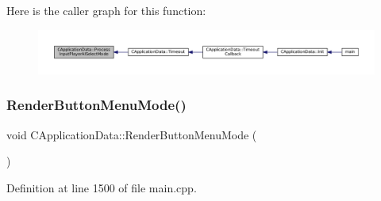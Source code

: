 Here is the caller graph for this function\+:
\nopagebreak
\begin{figure}[H]
\begin{center}
\leavevmode
\includegraphics[width=350pt]{classCApplicationData_a096afda0b6459cfa73d66518ce23f68e_icgraph}
\end{center}
\end{figure}
\hypertarget{classCApplicationData_a4766e5533d32e4194816f5a4ea838bd3}{}\label{classCApplicationData_a4766e5533d32e4194816f5a4ea838bd3} 
\subsubsection{\texorpdfstring{Render\+Button\+Menu\+Mode()}{RenderButtonMenuMode()}}
{\footnotesize\ttfamily void C\+Application\+Data\+::\+Render\+Button\+Menu\+Mode (\begin{DoxyParamCaption}{ }\end{DoxyParamCaption})\hspace{0.3cm}{\ttfamily [protected]}}



Definition at line 1500 of file main.\+cpp.


